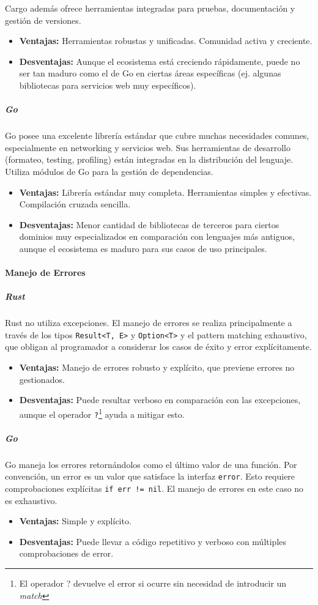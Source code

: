 Cargo además ofrece herramientas integradas para pruebas, documentación y gestión de versiones.
\begin{itemize}
    \item \textbf{Ventajas:} Herramientas robustas y unificadas. Comunidad activa y creciente.
    \item \textbf{Desventajas:} Aunque el ecosistema está creciendo rápidamente, puede no ser tan maduro como el de Go en ciertas áreas específicas (ej. algunas bibliotecas para servicios web muy específicos).
\end{itemize}

\subparagraph{Go}
Go posee una excelente librería estándar que cubre muchas necesidades comunes, especialmente en networking y servicios web. Sus herramientas de desarrollo (formateo, testing, profiling) están integradas en la distribución del lenguaje. Utiliza módulos de Go para la gestión de dependencias.
\begin{itemize}
    \item \textbf{Ventajas:} Librería estándar muy completa. Herramientas simples y efectivas. Compilación cruzada sencilla.
    \item \textbf{Desventajas:} Menor cantidad de bibliotecas de terceros para ciertos dominios muy especializados en comparación con lenguajes más antiguos, aunque el ecosistema es maduro para sus casos de uso principales.
\end{itemize}

\paragraph{Manejo de Errores}
\subparagraph{Rust}
Rust no utiliza excepciones. El manejo de errores se realiza principalmente a través de los tipos \texttt{Result<T, E>} y \texttt{Option<T>} y el pattern matching exhaustivo, que obligan al programador a considerar los casos de éxito y error explícitamente.
\begin{itemize}
    \item \textbf{Ventajas:} Manejo de errores robusto y explícito, que previene errores no gestionados.
    \item \textbf{Desventajas:} Puede resultar verboso en comparación con las excepciones, aunque el operador \texttt{?}\footnote{El operador ? devuelve el error si ocurre sin necesidad de introducir un \textit{match}} ayuda a mitigar esto.
\end{itemize}

\subparagraph{Go}
Go maneja los errores retornándolos como el último valor de una función. Por convención, un error es un valor que satisface la interfaz \texttt{error}. Esto requiere comprobaciones explícitas \texttt{if err != nil}.
El manejo de errores en este caso no es exhaustivo.
\begin{itemize}
    \item \textbf{Ventajas:} Simple y explícito.
    \item \textbf{Desventajas:} Puede llevar a código repetitivo y verboso con múltiples comprobaciones de error.
\end{itemize}

